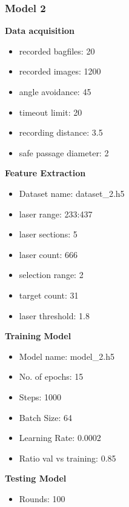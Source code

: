 \subsubsection{Model 2\label{model_2} }
\begin{multicols}{2}
\textbf{Data acquisition}
\begin{itemize}
\setlength\itemsep{0.1em}
\item recorded bagfiles: 20
\item recorded images: 1200
\item angle avoidance: 45
\item timeout limit: 20
\item recording distance: 3.5
\item safe passage diameter: 2
\end{itemize}

\textbf{Feature Extraction}
\begin{itemize}
\setlength\itemsep{0.1em}
\item Dataset name: dataset\_2.h5
\item  laser range: 233:437
\item  laser sections: 5
\item  laser count: 666
\item  selection range: 2
\item  target count: 31
\item  laser threshold: 1.8
\end{itemize}

\columnbreak

\textbf{Training Model}
\begin{itemize}
\setlength\itemsep{0.1em}
\item  Model name: model\_2.h5
\item  No. of epochs: 15
\item  Steps: 1000
\item  Batch Size: 64
\item  Learning Rate: 0.0002
\item  Ratio val vs training: 0.85
\end{itemize}

\textbf{Testing Model}
\begin{itemize}
\setlength\itemsep{0.1em}
\item Rounds: 100
\newline
\newline
\newline
\newline
\newline
\newline
\newline
\newline
\end{itemize}
\end{multicols}

